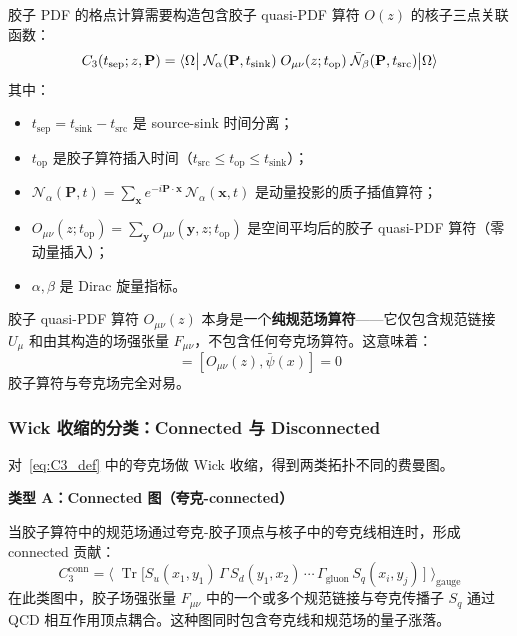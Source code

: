 \documentclass[11pt,a4paper]{ctexart}
\newcommand{\Fmunu}{F_{\mu\nu}}
\newcommand{\tr}{\operatorname{Tr}}
\begin{document}
胶子 PDF 的格点计算需要构造包含胶子 quasi-PDF 算符 $O(z)$ 的核子三点关联函数：
\begin{equation}\label{eq:C3_def}
C_3(t_{\text{sep}}; z, \mathbf{P}) =
\braket{\Omega \big|
\;\mathcal{N}_\alpha(\mathbf{P}, t_{\text{sink}}) \;
O_{\mu\nu}(z; t_{\text{op}}) \;
\bar{\mathcal{N}}_\beta(\mathbf{P}, t_{\text{src}})
\big| \Omega}
\end{equation}
其中：
\begin{itemize}
  \item $t_{\text{sep}} = t_{\text{sink}} - t_{\text{src}}$ 是 source-sink 时间分离；
  \item $t_{\text{op}}$ 是胶子算符插入时间（$t_{\text{src}} \le t_{\text{op}} \le t_{\text{sink}}$）；
  \item $\mathcal{N}_\alpha(\mathbf{P}, t) = \sum_{\mathbf{x}} e^{-i\mathbf{P}\cdot\mathbf{x}} \, \mathcal{N}_\alpha(\mathbf{x}, t)$ 是动量投影的质子插值算符；
  \item $O_{\mu\nu}(z; t_{\text{op}}) = \sum_{\mathbf{y}} O_{\mu\nu}(\mathbf{y}, z; t_{\text{op}})$ 是空间平均后的胶子 quasi-PDF 算符（零动量插入）；
  \item $\alpha,\beta$ 是 Dirac 旋量指标。
\end{itemize}

胶子 quasi-PDF 算符 $O_{\mu\nu}(z)$ 本身是一个\textbf{纯规范场算符}——它仅包含规范链接 $U_\mu$ 和由其构造的场强张量 $\Fmunu$，不包含任何夸克场算符。这意味着：
\begin{equation}
[O_{\mu\nu}(z), \psi(x)] = [O_{\mu\nu}(z), \bar{\psi}(x)] = 0
\end{equation}
胶子算符与夸克场完全对易。

\subsubsection{Wick 收缩的分类：Connected 与 Disconnected}

对~\eqref{eq:C3_def} 中的夸克场做 Wick 收缩，得到两类拓扑不同的费曼图。

\textbf{类型 A：Connected 图（夸克-connected）}

当胶子算符中的规范场通过夸克-胶子顶点与核子中的夸克线相连时，形成 connected 贡献：
\begin{equation}\label{eq:connected}
C_3^{\text{conn}} = \big\langle\;
\tr\big[ S_u(x_1, y_1) \, \Gamma \, S_d(y_1, x_2) \, \cdots \,
\Gamma_{\text{gluon}} \, S_q(x_i, y_j) \,\big]
\;\big\rangle_{\text{gauge}}
\end{equation}
在此类图中，胶子场强张量 $F_{\mu\nu}$ 中的一个或多个规范链接与夸克传播子 $S_q$ 通过 QCD 相互作用顶点耦合。这种图同时包含夸克线和规范场的量子涨落。
\end{document}
